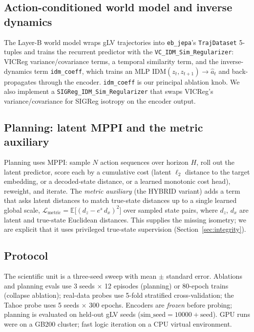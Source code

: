 \documentclass[11pt]{article}
\newcommand{\code}[1]{\texttt{#1}}
\begin{document}
\subsection{Action-conditioned world model and inverse dynamics}
\label{sec:idm-method}
The Layer-B world model wraps gLV trajectories into \texttt{eb\_jepa}'s
\code{TrajDataset} 5-tuples and trains the recurrent predictor with the
\code{VC\_IDM\_Sim\_Regularizer}: VICReg variance/covariance terms, a temporal
similarity term, and the inverse-dynamics term
\code{idm\_coeff}, which trains an MLP $\mathrm{IDM}(z_t,z_{t+1})\!\to\!\hat a_t$
and back-propagates through the encoder. \code{idm\_coeff} is our principal
ablation knob. We also implement a \code{SIGReg\_IDM\_Sim\_Regularizer} that
swaps VICReg's variance/covariance for SIGReg isotropy on the encoder output.

\subsection{Planning: latent MPPI and the metric auxiliary}
\label{sec:planning-method}
Planning uses MPPI: sample $N$ action sequences over horizon $H$, roll out the
latent predictor, score each by a cumulative cost (latent $\ell_2$ distance to
the target embedding, or a decoded-state distance, or a learned monotonic cost
head), reweight, and iterate. The \emph{metric auxiliary} (the HYBRID variant)
adds a term that asks latent distances to match true-state distances up to a
single learned global scale,
$\mathcal{L}_{\text{metric}} = \mathbb{E}\big[(d_z - e^{s}\,d_x)^2\big]$
over sampled state pairs, where $d_z$, $d_x$ are latent and true-state Euclidean
distances. This supplies the missing isometry; we are explicit that it uses
privileged true-state supervision (Section~\ref{sec:integrity}).

\subsection{Protocol}
The scientific unit is a three-seed sweep with mean $\pm$ standard error.
Ablations and planning evals use 3 seeds $\times$ 12 episodes (planning) or
80-epoch trains (collapse ablation); real-data probes use 5-fold stratified
cross-validation; the Tahoe probe uses 5 seeds $\times$ 300 epochs. Encoders are
\emph{frozen} before probing; planning is evaluated on held-out gLV seeds
($\text{sim\_seed} = 10000 + \text{seed}$). GPU runs were on a GB200 cluster;
fast logic iteration on a CPU virtual environment.
\end{document}
